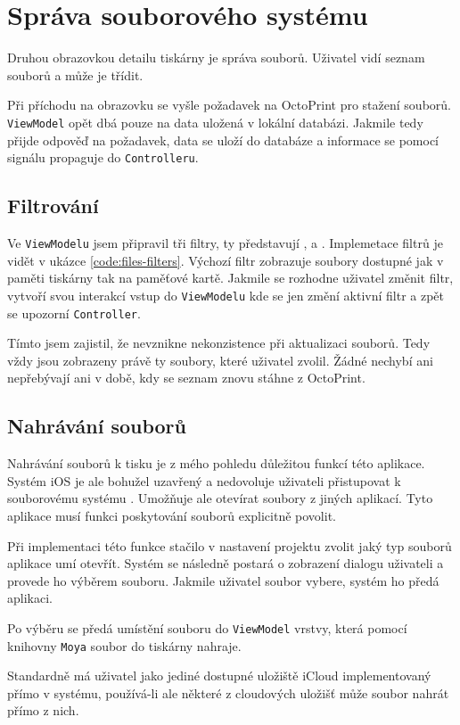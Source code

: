 \section{Správa souborového systému}

Druhou obrazovkou detailu tiskárny je správa souborů.
Uživatel vidí seznam souborů a může je třídit.

Při příchodu na obrazovku se vyšle požadavek na OctoPrint pro stažení souborů.
\texttt{ViewModel} opět dbá pouze na data uložená v lokální databázi.
Jakmile tedy přijde odpověď na požadavek, data se uloží do databáze a informace se pomocí signálu propaguje do \texttt{Controlleru}.

\subsection{Filtrování}

Ve \texttt{ViewModelu} jsem připravil tři filtry, ty představují ,  a .
Implemetace filtrů je vidět v ukázce \ref{code:files-filters}.
Výchozí filtr zobrazuje soubory dostupné jak v paměti tiskárny tak na paměťové kartě.
Jakmile se rozhodne uživatel změnit filtr, vytvoří svou interakcí vstup do \texttt{ViewModelu} kde se jen změní aktivní filtr a zpět se upozorní \texttt{Controller}.


Tímto jsem zajistil, že nevznikne nekonzistence při aktualizaci souborů.
Tedy vždy jsou zobrazeny právě ty soubory, které uživatel zvolil.
Žádné nechybí ani nepřebývají ani v době, kdy se seznam znovu stáhne z OctoPrint.

\subsection{Nahrávání souborů}

Nahrávání souborů k tisku je z mého pohledu důležitou funkcí této aplikace.
Systém iOS je ale bohužel uzavřený a nedovoluje uživateli přistupovat k souborovému systému \cite{imobile-access-fs}.
Umožňuje ale otevírat soubory z jiných aplikací.
Tyto aplikace musí funkci poskytování souborů explicitně povolit.

Při implementaci této funkce stačilo v nastavení projektu zvolit jaký typ souborů aplikace umí otevřít.
Systém se následně postará o zobrazení dialogu uživateli a provede ho výběrem souboru.
Jakmile uživatel soubor vybere, systém ho předá aplikaci.


\bigskip{}

Po výběru se předá umístění souboru do \texttt{ViewModel} vrstvy, která pomocí knihovny \texttt{Moya} soubor do tiskárny nahraje.

Standardně má uživatel jako jediné dostupné uložiště iCloud implementovaný přímo v systému, používá-li ale některé z cloudových uložišť může soubor nahrát přímo z nich.
